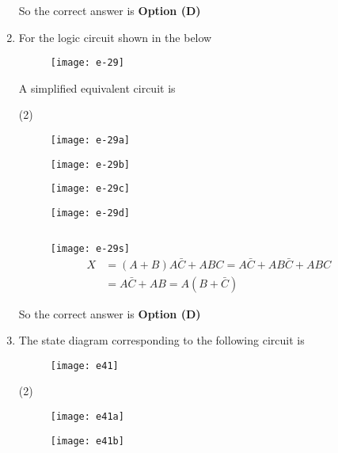 \begin{enumerate}
\begin{answer}
So the correct answer is \textbf{Option (D)}
\end{answer}
	\item For the logic circuit shown in the below\\
	\begin{figure}[H]
		\centering
		\texttt{[image: e-29]}
	\end{figure}
	A simplified equivalent circuit is
{	}
\begin{tasks}(2)
\task[\textbf{A.}] 
\begin{figure}[H]
	\centering
	\texttt{[image: e-29a]}
\end{figure}
\task[\textbf{B.}] \begin{figure}[H]
	\centering
	\texttt{[image: e-29b]}
\end{figure}
\task[\textbf{C.}] \begin{figure}[H]
	\centering
	\texttt{[image: e-29c]}
\end{figure}
\task[\textbf{D.}] \begin{figure}[H]
	\centering
	\texttt{[image: e-29d]}
\end{figure}
\end{tasks}
\begin{answer}$\left. \right. $
\begin{figure}[H]
	\centering
	\texttt{[image: e-29s]}
	\begin{align*}
	X&=(A+B) A \bar{C}+A B C=A \bar{C}+A B \bar{C}+A B C\\&=A \bar{C}+A B=A(B+\bar{C})
	\end{align*}
\end{figure}
So the correct answer is \textbf{Option (D)}
\end{answer}
	\item The state diagram corresponding to the following circuit is
{	}
\begin{figure}[H]
\centering
\texttt{[image: e41]}
\end{figure}
\begin{tasks}(2)
\task[\textbf{A.}] \begin{figure}[H]
	\centering
	\texttt{[image: e41a]}
\end{figure}
\task[\textbf{B.}] \begin{figure}[H]
	\centering
	\texttt{[image: e41b]}

\end{figure}
\end{tasks}
\end{enumerate}
